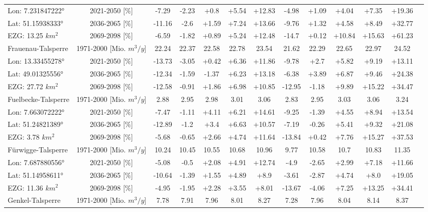 \begin{longtable}{@{\extracolsep{\fill}}lc|ccccc||cccccc}
\cline{2-12} 
Lon: 7.231847222° & 2021-2050 [\%]  & -7.29 & -2.23 & +0.8 & +5.54 & +12.83 & -4.98 & +1.09 & +4.04 & +7.35 & +19.36\\ 
Lat: 51.15938333° & 2036-2065 [\%]  & -11.16 & -2.6 & +1.59 & +7.24 & +13.66 & -9.76 & +1.32 & +4.58 & +8.49 & +32.77\\ 
EZG: 13.25 $km^2$ & 2069-2098 [\%]  & -6.59 & -1.82 & +0.89 & +5.24 & +12.48 & -14.7 & +0.12 & +10.84 & +15.63 & +61.23\\ 
\hline 
Frauenau-Talsperre & 1971-2000 [Mio. $m^3/y$]  & 22.24 & 22.37 & 22.58 & 22.78 & 23.54 & 21.62 & 22.29 & 22.65 & 22.97 & 24.52\\ 
\cline{2-12} 
Lon: 13.33455278° & 2021-2050 [\%]  & -13.73 & -3.05 & +0.42 & +6.36 & +11.86 & -9.78 & +2.7 & +5.82 & +9.19 & +13.11\\ 
Lat: 49.01325556° & 2036-2065 [\%]  & -12.34 & -1.59 & -1.37 & +6.23 & +13.18 & -6.38 & +3.89 & +6.87 & +9.46 & +24.38\\ 
EZG: 27.72 $km^2$ & 2069-2098 [\%]  & -12.58 & -0.91 & +1.86 & +6.98 & +10.85 & -12.95 & -1.18 & +9.89 & +15.22 & +34.47\\ 
\hline 
Fuelbecke-Talsperre & 1971-2000 [Mio. $m^3/y$]  & 2.88 & 2.95 & 2.98 & 3.01 & 3.06 & 2.83 & 2.95 & 3.03 & 3.06 & 3.24\\ 
\cline{2-12} 
Lon: 7.663072222° & 2021-2050 [\%]  & -7.47 & -1.11 & +4.11 & +6.21 & +14.61 & -9.25 & -1.39 & +4.55 & +8.94 & +13.54\\ 
Lat: 51.24821389° & 2036-2065 [\%]  & -12.89 & -1.2 & +3.4 & +6.63 & +10.57 & -7.19 & -0.26 & +5.41 & +9.32 & +21.08\\ 
EZG: 3.78 $km^2$ & 2069-2098 [\%]  & -5.68 & -0.65 & +2.66 & +4.74 & +11.64 & -13.84 & +0.42 & +7.76 & +15.27 & +37.53\\ 
\hline 
Fürwigge-Talsperre & 1971-2000 [Mio. $m^3/y$]  & 10.24 & 10.45 & 10.55 & 10.68 & 10.96 & 9.77 & 10.58 & 10.7 & 10.83 & 11.35\\ 
\cline{2-12} 
Lon: 7.687880556° & 2021-2050 [\%]  & -5.08 & -0.5 & +2.08 & +4.91 & +12.74 & -4.9 & -2.65 & +2.99 & +7.18 & +11.66\\ 
Lat: 51.14958611° & 2036-2065 [\%]  & -10.64 & -1.39 & +1.55 & +4.89 & +8.9 & -3.61 & -2.87 & +4.74 & +8.0 & +19.05\\ 
EZG: 11.36 $km^2$ & 2069-2098 [\%]  & -4.95 & -1.95 & +2.28 & +3.55 & +8.01 & -13.67 & -4.06 & +7.25 & +13.25 & +34.41\\ 
\hline 
Genkel-Talsperre & 1971-2000 [Mio. $m^3/y$]  & 7.78 & 7.91 & 7.96 & 8.01 & 8.27 & 7.28 & 7.96 & 8.04 & 8.14 & 8.37\\ 

\end{longtable}
